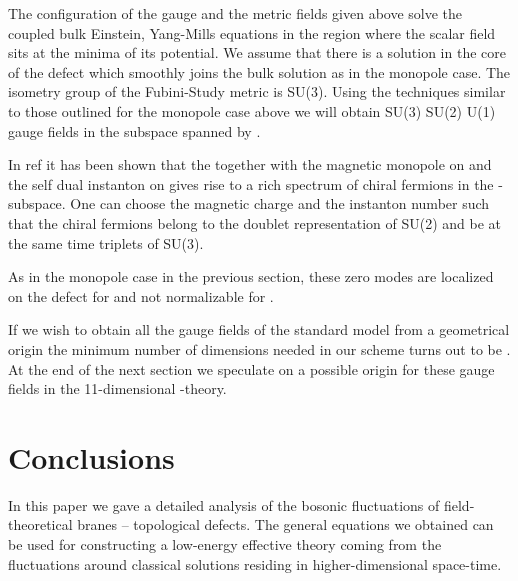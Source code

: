 \documentclass[a4paper,12pt]{article}
\begin{document}
The configuration of the gauge and the metric fields given above
solve the coupled bulk Einstein, Yang-Mills equations in the region
where the scalar field sits at the minima of its potential.  We
assume that there is a solution in the core of the defect which
smoothly joins the bulk solution as in the monopole case. The
isometry group of the Fubini-Study metric is SU(3). Using the
techniques similar to those outlined for the monopole case above we
will obtain SU(3)\myHighlight{$\times$}\coordHE{} SU(2)\myHighlight{$\times$}\coordHE{} U(1) gauge fields in the
subspace spanned by \coordHE{}.

In ref \cite{Dvali:2001qr} it has been shown that the \coordHE{} together with the magnetic monopole on \coordHE{} and the self dual
instanton on \coordHE{} gives rise to a rich spectrum of chiral fermions
in the \coordHE{}-subspace. One can choose the magnetic charge and the
instanton number such that the chiral fermions belong to the doublet
representation of SU(2) and be at the same time triplets of SU(3).

As in the monopole case in the previous section, these zero modes are
localized on the defect for \coordHE{} and not normalizable for
\coordHE{}.

If we wish to obtain all the gauge fields of the standard model from
a geometrical origin the minimum number of dimensions needed in our
scheme turns out to be \coordHE{}.  At the end of the next section
we speculate on a possible origin for these gauge fields in the
11-dimensional \coordHE{}-theory.


\section{Conclusions}

In this paper we gave a detailed analysis of the bosonic fluctuations
of field-theoretical branes -- topological defects. The general
equations we obtained can be used for constructing a low-energy
effective theory coming from the fluctuations around classical
solutions residing in higher-dimensional space-time.
\end{document}
